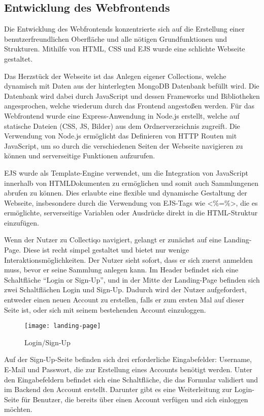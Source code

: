\subsection{Entwicklung des Webfrontends}\label{subsec:entwicklung-des-webfrontends}
Die Entwicklung des Webfrontends konzentrierte sich auf die Erstellung einer benutzerfreundlichen Oberfläche und alle nötigen Grundfunktionen und Strukturen.
Mithilfe von HTML, CSS und EJS wurde eine schlichte Webseite gestaltet.

Das Herzstück der Webseite ist das Anlegen eigener Collections, welche dynamisch mit Daten aus der hinterlegten MongoDB Datenbank befüllt wird.
Die Datenbank wird dabei durch JavaScript und dessen Frameworks und Bibliotheken angesprochen, welche wiederum durch das Frontend angestoßen werden.
Für das Webfrontend wurde eine Express-Anwendung in Node.js erstellt, welche auf statische Dateien (CSS, JS, Bilder) aus dem Ordnerverzeichnis zugreift.
Die Verwendung von Node.js ermöglicht das Definieren von HTTP Routen mit JavaScript, um so durch die verschiedenen Seiten der Webseite navigieren zu können und serverseitige Funktionen aufzurufen.

EJS wurde als Template-Engine verwendet, um die Integration von JavaScript innerhalb von HTMLDokumenten zu ermöglichen und somit auch Sammlungenen abrufen zu können.
Dies erlaubte eine flexible und dynamische Gestaltung der Webseite, insbesondere durch die Verwendung von EJS-Tags wie \grqq\textless{}\%=\%\textgreater{}\grqq{}, die es ermöglichte, serverseitige Variablen oder Ausdrücke direkt in die HTML-Struktur einzufügen.

Wenn der Nutzer zu Collectiqo navigiert, gelangt er zunächst auf eine Landing-Page.
Diese ist recht simpel gestaltet und bietet nur wenige Interaktionsmöglichkeiten.
Der Nutzer sieht sofort, dass er sich zuerst anmelden muss, bevor er seine Sammlung anlegen kann.
Im Header befindet sich eine Schaltfläche “Login or Sign-Up”, und in der Mitte der Landing-Page befinden sich zwei Schaltflächen Login und Sign-Up.
Dadurch wird der Nutzer aufgefordert, entweder einen neuen Account zu erstellen, falls er zum ersten Mal auf dieser Seite ist, oder sich mit seinem bestehenden Account einzuloggen.

\begin{figure}[h]
    \centering
    \texttt{[image: landing-page]}
    \caption{Login/Sign-Up}
    \label{fig:landing-page}
\end{figure}

Auf der Sign-Up-Seite befinden sich drei erforderliche Eingabefelder: Username, E-Mail und Passwort, die zur Erstellung eines Accounts benötigt werden.
Unter den Eingabefeldern befindet sich eine Schaltfläche, die das Formular validiert und im Backend den Account erstellt.
Darunter gibt es eine Weiterleitung zur Login-Seite für Benutzer, die bereits über einen Account verfügen und sich einloggen möchten.


